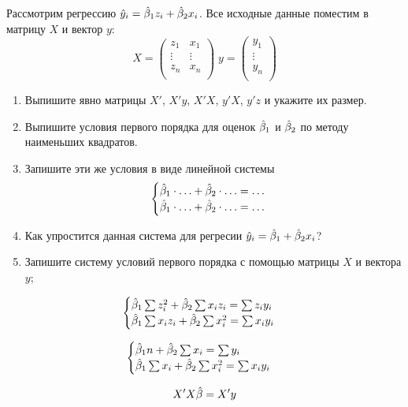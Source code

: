 \begin{problem}
Рассмотрим регрессию $\hat{y}_i = \hat{\beta}_1 z_i + \hat{\beta}_2 x_i$.
Все исходные данные поместим в матрицу $X$ и вектор $y$:
\[
X = \begin{pmatrix}
z_1 & x_1 \\
\vdots & \vdots \\
z_n & x_n \\
\end{pmatrix} \;
y = \begin{pmatrix}
y_1 \\
\vdots \\
y_n \\
\end{pmatrix}
\]
\begin{enumerate}
  \item Выпишите явно матрицы $X'$, $X'y$, $X'X$, $y'X$, $y'z$ и укажите их размер.
  \item Выпишите условия первого порядка для оценок $\hat{\beta}_1$ и $\hat{\beta}_2$ по методу наименьших квадратов.
  \item Запишите эти же условия в виде линейной системы
  \[
\begin{cases}
\hat{\beta}_1 \cdot \ldots + \hat{\beta}_2 \cdot \ldots = \ldots \\
\hat{\beta}_1 \cdot \ldots + \hat{\beta}_2 \cdot \ldots = \ldots \\
\end{cases}
  \]
  \item Как упростится данная система для регресии $\hat{y}_i = \hat{\beta}_1 + \hat{\beta}_2 x_i$?
  \item Запишите систему условий первого порядка с помощью матрицы $X$ и вектора $y$;
\end{enumerate}

\begin{sol}
\[
\begin{cases}
\hat{\beta}_1 \sum z_i^2 + \hat{\beta}_2 \sum x_i z_i = \sum z_i y_ i \\
\hat{\beta}_1 \sum x_i z_i + \hat{\beta}_2 \sum x_i^2 = \sum x_i y_ i \\
\end{cases}
\]

\[
\begin{cases}
\hat{\beta}_1 n + \hat{\beta}_2 \sum x_i = \sum y_ i \\
\hat{\beta}_1 \sum x_i + \hat{\beta}_2 \sum x_i^2 = \sum x_i y_ i \\
\end{cases}
\]

\[
X'X\hat{\beta} = X'y
\]

\end{sol}
\end{problem}




